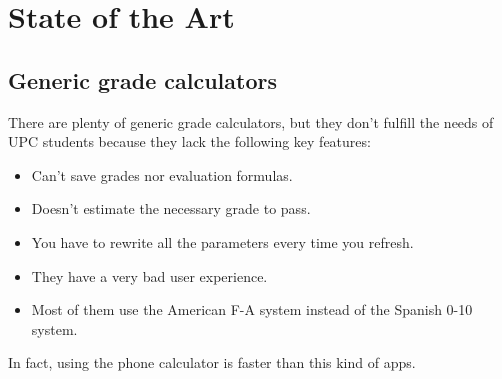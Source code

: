 



\clearpage\newpage
\section{State of the Art}

\subsection{Generic grade calculators}
There are plenty of generic grade calculators, but they don't fulfill the needs of UPC students because they lack the following key features:
\begin{itemize}
    \setlength\itemsep{-0.5em}
    \item Can't save grades nor evaluation formulas.
    \item Doesn't estimate the necessary grade to pass.
    \item You have to rewrite all the parameters every time you refresh.
    \item They have a very bad user experience.
    \item Most of them use the American F-A system instead of the Spanish 0-10 system.
\end{itemize}
In fact, using the phone calculator is faster than this kind of apps.


